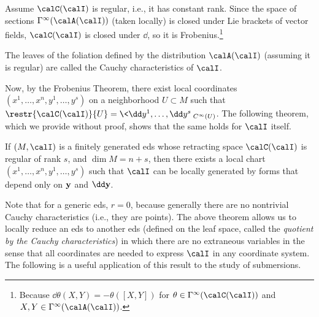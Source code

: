 Assume $\calC(\calI)$ is regular, i.e., it has constant rank. Since the space of sections $\Gamma^\infty(\calA(\calI))$ (taken locally) is closed under Lie brackets of vector fields, $\calC(\calI)$ is closed under $\dd$, so it is Frobenius.\footnote{Because $\dd\theta(X,Y)=-\theta([X,Y])$ for $\theta\in\Gamma^\infty(\calC(\calI))$ and $X,Y\in\Gamma^\infty(\calA(\calI))$.} 

\begin{defn}
    The leaves of the foliation defined by the distribution $\calA(\calI)$ (assuming it is regular) are called the Cauchy characteristics of $\calI$.
\end{defn}

Now, by the Frobenius Theorem, there exist local coordinates $(x^1,\ldots,x^n,y^1,\ldots,y^s)$ on a neighborhood $U\subset M$ such that $\restr{\calC(\calI)}{U}=\<\dd y^1,\ldots,\dd y^s\>_{C^\infty(U)}$. The following theorem, which we provide without proof, shows that the same holds for $\calI$ itself.

\begin{thm}\label{thm 2.2 Bryant}
    If $(M,\calI)$ is a finitely generated \gls{eds} whose retracting space $\calC(\calI)$ is regular of rank $s$, and $\dim M=n+s$, then there exists a local chart $(x^1,\ldots,x^n,y^1,\ldots,y^s)$ such that $\calI$ can be locally generated by forms that depend only on $\bf{y}$ and $\dd \bf{y}$.
\end{thm}

Note that for a generic \gls{eds}, $r=0$, because generally there are no nontrivial Cauchy characteristics (i.e., they are points). The above theorem allows us to locally reduce an \gls{eds} to another \gls{eds} (defined on the leaf space, called the \emph{quotient by the Cauchy characteristics}) in which there are no extraneous variables in the sense that all coordinates are needed to express $\calI$ in any coordinate system. The following is a useful application of this result to the study of submersions.

